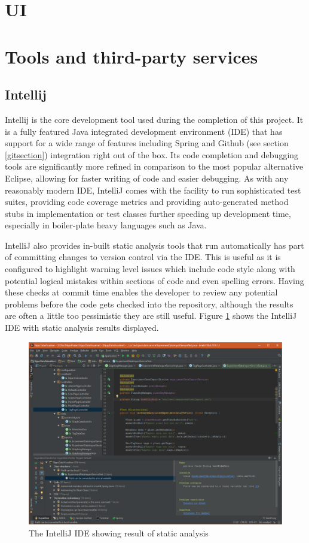 \section{UI}

\section{Tools and third-party services}
\subsection{Intellij}

Intellij \cite{_intellij} is the core development tool used during the completion of this project. It is a fully featured Java integrated development environment (IDE) that has support for a wide range of features including Spring and Github (see section \ref{gitsection}) integration right out of the box. Its code completion and debugging tools are significantly more refined in comparison to the most popular alternative Eclipse, allowing for faster writing of code and easier debugging. As with any reasonably modern IDE, IntelliJ comes with the facility to run sophisticated test suites, providing code coverage metrics and providing auto-generated method stubs in implementation or test classes further speeding up development time, especially in boiler-plate heavy languages such as Java.

IntelliJ also provides in-built static analysis tools that run automatically has part of committing changes to version control via the IDE. This is useful as it is configured to highlight warning level issues which include code style along with potential logical mistakes within sections of code and even spelling errors. Having these checks at commit time enables the developer to review any potential problems before the code gets checked into the repository, although the results are often a little too pessimistic they are still useful. Figure \ref{fig:intellij} shows the IntelliJ IDE with static analysis results displayed.

\begin{figure}[H]
    \centering
    \includegraphics[width=\textwidth]{images/tools/intellij}
    \caption{The IntelliJ IDE showing result of static analysis}
    \label{fig:intellij}
\end{figure}


